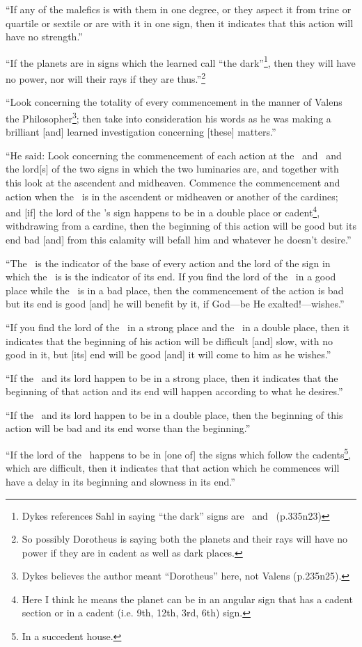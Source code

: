 ``If  any of the malefics is with them in one degree, or they aspect it from trine or quartile or sextile or are with it in one sign, then it indicates that this action will have no strength.''

``If  the planets are in signs which the learned call ``the dark''\footnote{Dykes references Sahl in saying ``the dark'' signs are \Libra\, and \Capricorn\, (p.335n23)}, then they will have no power, nor will their rays if they are thus.''\footnote{So possibly Dorotheus is saying both the planets and their rays will have no power if they are in cadent as well as dark places.} 

``Look  concerning the totality of every commencement in the manner of Valens the Philosopher\footnote{Dykes believes the author meant ``Dorotheus'' here, not Valens (p.235n25).}; then take into consideration his words as he was making a brilliant [and] learned investigation concerning [these] matters.''

``He  said: Look concerning the commencement of each action at the \Sun\, and \Moon\, and the lord[s] of the two signs in which the two luminaries are, and together with this look at the ascendent and midheaven. Commence the commencement and action when the \Moon\, is in the ascendent or midheaven or another of the cardines; and [if] the lord of the \Moon's sign happens to be in a double place or cadent\footnote{Here I think he means the planet can be in an angular sign that has a cadent section or in a cadent (i.e. 9th, 12th, 3rd, 6th) sign.}, withdrawing from a cardine, then the beginning of this action will be good but its end bad [and] from this calamity will befall him and whatever he doesn't desire.''

``The \Moon\, is the indicator of the base of every action and the lord of the sign in which the \Moon\, is is the indicator of its end. If you find the lord of the \Moon\, in a good place while the \Moon\, is in a bad place, then the commencement of the action is bad but its end is good [and] he will benefit by it, if God---be He exalted!---wishes.''

``If  you find the lord of the \Moon\, in a strong place and the \Moon\, in a double place, then it indicates that the beginning of his action will be difficult [and] slow, with no good in it, but [its] end will be good [and] it will come to him as he wishes.''

``If  the \Moon\, and its lord happen to be in a strong place, then it indicates that the beginning of that action and its end will happen according to what he desires.''

``If  the \Moon\, and its lord happen to be in a double place, then the beginning of this action will be bad and its end worse than the beginning.''

``If  the lord of the \Moon\, happens to be in [one of] the signs which follow the cadents\footnote{In a succedent house.}, which are difficult, then it indicates that that action which he commences will have a delay in its beginning and slowness in its end.''




